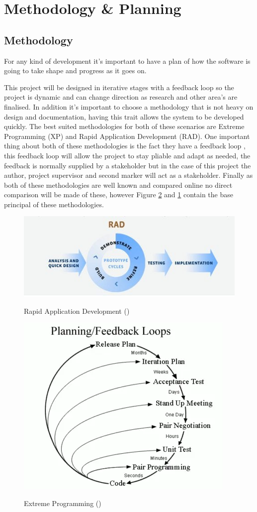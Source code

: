 \section{Methodology \& Planning}
\subsection{Methodology}
For any kind of development it's important to have a plan of how the software is going to take shape and progress as it goes on. 

This project will be designed in iterative stages with a feedback loop so the project is dynamic and can change direction as research and other area's are finalised. In addition it's important to choose a methodology that is not heavy on design and documentation, having this trait allows the system to be developed quickly. The best suited methodologies for both of these scenarios are Extreme Programming (XP) and Rapid Application Development (RAD). One important thing about both of these methodologies is the fact they have a feedback loop , this feedback loop will allow the project to stay pliable and adapt as needed, the feedback is normally supplied by a stakeholder but in the case of this project the author, project supervisor and second marker will act as a stakeholder. Finally as both of these methodologies are well known and compared online no direct comparison will be made of these, however Figure \ref{fig:xp} and \ref{fig:rad} contain the base principal of these methodologies.

\begin{figure}[h]
	\includegraphics[width=\linewidth]{./images/methodology/RAD.png}\\
	\caption{Rapid Application Development (\cite{ankitasingh_2019_what})}
	\label{fig:rad}
\end{figure}
\begin{figure}[h]
	\includegraphics[width=0.5\linewidth]{./images/methodology/XP.png}\\
	\caption{Extreme Programming (\cite{ponomareff_learning})}
	\label{fig:xp}
\end{figure}



